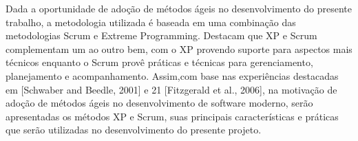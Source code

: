 Dada a oportunidade de adoção de métodos ágeis no desenvolvimento do presente trabalho, a 
metodologia utilizada é baseada em uma combinação das metodologias Scrum e Extreme Programming. Destacam que XP e Scrum complementam um ao outro bem, com o XP provendo suporte para aspectos mais técnicos enquanto o Scrum provê práticas e técnicas para gerenciamento, planejamento e acompanhamento. Assim,com base nas experiências destacadas em [Schwaber and Beedle, 2001] e 21 [Fitzgerald et al., 2006], na motivação de adoção de métodos ágeis no desenvolvimento de software moderno, serão apresentadas os métodos XP e Scrum, suas principais características e práticas que serão utilizadas no desenvolvimento do presente projeto.

